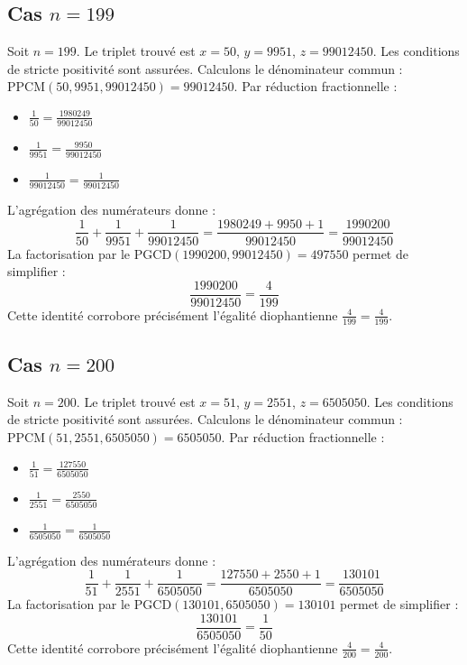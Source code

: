 \documentclass[11pt,a4paper]{article}
\begin{document}
\subsection{Cas $n = 199$}
Soit $n = 199$. Le triplet trouvé est $x = 50$, $y = 9951$, $z = 99012450$.
Les conditions de stricte positivité sont assurées.
Calculons le dénominateur commun : $\text{PPCM}(50, 9951, 99012450) = 99012450$.
Par réduction fractionnelle :
\begin{itemize}
    \item $\frac{1}{50} = \frac{1980249}{99012450}$
    \item $\frac{1}{9951} = \frac{9950}{99012450}$
    \item $\frac{1}{99012450} = \frac{1}{99012450}$
\end{itemize}
L'agrégation des numérateurs donne :
$$ \frac{1}{50} + \frac{1}{9951} + \frac{1}{99012450} = \frac{1980249 + 9950 + 1}{99012450} = \frac{1990200}{99012450} $$
La factorisation par le $\text{PGCD}(1990200, 99012450) = 497550$ permet de simplifier :
$$ \frac{1990200}{99012450} = \frac{4}{199} $$
Cette identité corrobore précisément l'égalité diophantienne $\frac{4}{199} = \frac{4}{199}$.

\subsection{Cas $n = 200$}
Soit $n = 200$. Le triplet trouvé est $x = 51$, $y = 2551$, $z = 6505050$.
Les conditions de stricte positivité sont assurées.
Calculons le dénominateur commun : $\text{PPCM}(51, 2551, 6505050) = 6505050$.
Par réduction fractionnelle :
\begin{itemize}
    \item $\frac{1}{51} = \frac{127550}{6505050}$
    \item $\frac{1}{2551} = \frac{2550}{6505050}$
    \item $\frac{1}{6505050} = \frac{1}{6505050}$
\end{itemize}
L'agrégation des numérateurs donne :
$$ \frac{1}{51} + \frac{1}{2551} + \frac{1}{6505050} = \frac{127550 + 2550 + 1}{6505050} = \frac{130101}{6505050} $$
La factorisation par le $\text{PGCD}(130101, 6505050) = 130101$ permet de simplifier :
$$ \frac{130101}{6505050} = \frac{1}{50} $$
Cette identité corrobore précisément l'égalité diophantienne $\frac{4}{200} = \frac{4}{200}$.
\end{document}
